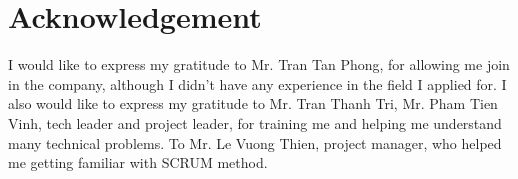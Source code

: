 \chapter{Acknowledgement}

I would like to express my gratitude to Mr. Tran Tan Phong, for allowing me join in the company, although I didn't have any experience in the field I applied for. I also would like to express my gratitude to Mr. Tran Thanh Tri, Mr. Pham Tien Vinh, tech leader and project leader, for training me and helping me understand many technical problems. To Mr. Le Vuong Thien, project manager, who helped me getting familiar with SCRUM method. 